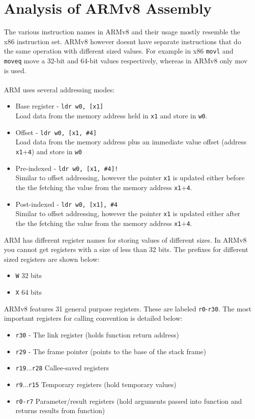 \documentclass{article}
\begin{document}
\section{Analysis of ARMv8 Assembly}
The various instruction names in ARMv8 and their usage mostly resemble the x86 instruction set. ARMv8 however doesnt have separate instructions that do the same operation with different sized values. For example in x86 \verb+movl+ and \verb+moveq+ move a 32-bit and 64-bit values respectively, whereas in ARMv8 only mov is used. \\ \\ \noindent ARM uses several addressing modes:
\begin{itemize}
\item Base register - \verb+ldr w0, [x1]+ \\
Load data from the memory address held in \verb+x1+ and store in \verb+w0+.
\item Offset - \verb+ldr w0, [x1, #4]+ \\
Load data from the memory address plus an immediate value offset (address \verb+x1++\verb+4+) and store in \verb+w0+
\item Pre-indexed - \verb+ldr w0, [x1, #4]!+\\
Similar to offset addressing, however the pointer \verb+x1+ is updated either before the the fetching the value from the memory address \verb+x1++\verb+4+.

\item Post-indexed - \verb+ldr w0, [x1], #4+\\
Similar to offset addressing, however the pointer \verb+x1+ is updated either after the the fetching the value from the memory address \verb+x1++\verb+4+. \\
\end{itemize}
\noindent ARM has different register names for storing values of different sizes. In ARMv8 you cannot get registers with a size of less than 32 bits. The prefixes for different sized registers are shown below:
\begin{itemize}
\item \verb+W+ 32 bits
\item \verb+X+ 64 bits \\
\end{itemize}

\noindent ARMv8 features 31 general purpose registers. These are labeled \verb+r0+-\verb+r30+. The most important registers for calling convention is detailed below:
\begin{itemize}
\item \verb+r30+ - The link register (holds function return address)
\item \verb+r29+ - The frame pointer (points to the base of the stack frame)
\item \verb+r19+...\verb+r28+ Callee-saved registers
\item \verb+r9+...\verb+r15+ Temporary registers (hold temporary values)
\item \verb+r0-r7+ Parameter/result registers (hold arguments passed into function and returns results from function) \\
\end{itemize}
\end{document}
